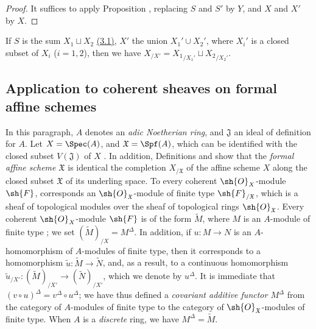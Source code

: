 \begin{proof}
It suffices to apply Proposition , replacing $S$ and $S'$ by $Y$, and $X$ and $X'$ by $X$.
\end{proof}

\begin{remark}[10.9.10]
\label{I.10.9.10}
If $S$ is the sum $X_1\sqcup X_2$ \hyperref[subsection:I.3.1]{(3.1)}, $X'$ the union $X_1'\cup X_2'$, where $X_i'$ is a closed subset of $X_i$ ($i=1,2$), then we have $X_{/X'}={X_1}_{/X_1'}\sqcup{X_2}_{/X_2'}$.
\end{remark}

\subsection{Application to coherent sheaves on formal affine schemes}
\label{subsection:I.10.10}

\begin{env}[10.10.1]
\label{I.10.10.1}
In this paragraph, $A$ denotes an \emph{adic Noetherian ring}, and $\mathfrak{J}$ an ideal of definition for $A$.
Let $X=\Spec(A)$, and $\mathfrak{X}=\Spf(A)$, which can be identified with the closed subset $V(\mathfrak{J})$ of $X$ .
In addition, Definitions  and  show that the \emph{formal affine scheme $\mathfrak{X}$} is identical the completion $X_{/\mathfrak{X}}$ of the affine scheme $X$ along the closed subset $\mathfrak{X}$ of its underling space.
To every coherent $\sh{O}_X$-module $\sh{F}$, corresponds an $\sh{O}_\mathfrak{X}$-module of finite type $\sh{F}_{/\mathfrak{X}}$, which is a sheaf of topological modules over the sheaf of topological rings $\sh{O}_\mathfrak{X}$.
Every coherent $\sh{O}_X$-module $\sh{F}$ is of the form $\widetilde{M}$, where $M$ is an $A$-module of finite type ; we set $(\widetilde{M})_{/X}=M^\Delta$.
In addition, if $u:M\to N$ is an $A$-homomorphism of $A$-modules of finite type, then it corresponds to a homomorphism $\widetilde{u}:\widetilde{M}\to\widetilde{N}$, and, as a result, to a continuous homomorphism $\widetilde{u}_{/X'}:(\widetilde{M})_{/X'}\to(\widetilde{N})_{/X'}$, which we denote by $u^\Delta$.
It is immediate that $(v\circ u)^\Delta=v^\Delta\circ u^\Delta$; we have thus defined a \emph{covariant additive functor $M^\Delta$} from the category of $A$-modules of finite type to the category of $\sh{O}_\mathfrak{X}$-modules of finite type.
When $A$ is a \emph{discrete} ring, we have $M^\Delta=\widetilde{M}$.
\end{env}

